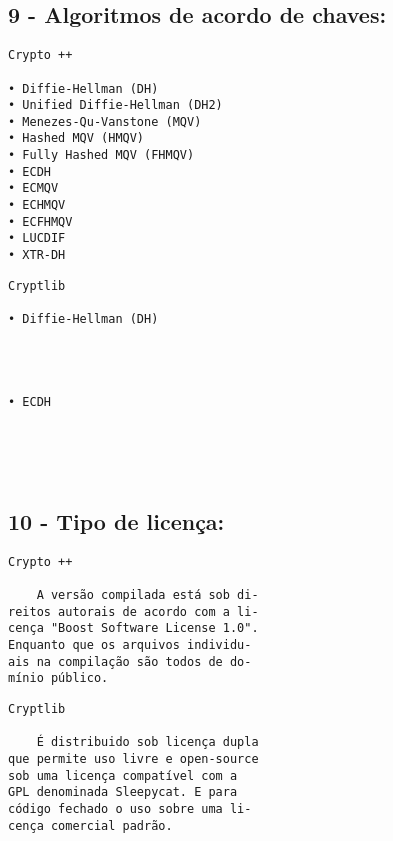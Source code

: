 \documentclass[
    article,            %
    11pt,               %
    oneside,            %
    a4paper,            %
    english,            %
    brazil,             %
    sumario=tradicional,
    ]{abntex2}
\begin{document}
\subsection*{\textbf{9 - Algoritmos de acordo de chaves:}}

\par\noindent
\begin{minipage}[t]{.49\textwidth}
\begin{Verbatim}[frame=single]
             Crypto ++

• Diffie-Hellman (DH)
• Unified Diffie-Hellman (DH2)
• Menezes-Qu-Vanstone (MQV)
• Hashed MQV (HMQV)
• Fully Hashed MQV (FHMQV)
• ECDH
• ECMQV
• ECHMQV
• ECFHMQV
• LUCDIF
• XTR-DH
\end{Verbatim}
\end{minipage}
\hfill
\begin{minipage}[t]{.49\textwidth}
\begin{Verbatim}[frame=single]
             Cryptlib

• Diffie-Hellman (DH)




• ECDH





\end{Verbatim}
\end{minipage}


\subsection*{\textbf{10 - Tipo de licença:}}

\par\noindent
\begin{minipage}[t]{.49\textwidth}
\begin{Verbatim}[frame=single]
             Crypto ++

    A versão compilada está sob di-
reitos autorais de acordo com a li-
cença "Boost Software License 1.0".
Enquanto que os arquivos individu-
ais na compilação são todos de do-
mínio público.
\end{Verbatim}
\end{minipage}
\hfill
\begin{minipage}[t]{.49\textwidth}
\begin{Verbatim}[frame=single]
             Cryptlib

    É distribuido sob licença dupla
que permite uso livre e open-source
sob uma licença compatível com a 
GPL denominada Sleepycat. E para
código fechado o uso sobre uma li-
cença comercial padrão.
\end{Verbatim}
\end{minipage}
\end{document}
